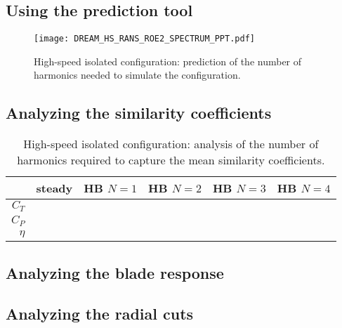 
\subsection{Using the prediction tool}
\label{sub:dream_hs_conv_hb_prediction_tool}

\begin{figure}[htp]
  \centering
  \texttt{[image: DREAM\_HS\_RANS\_ROE2\_SPECTRUM\_PPT.pdf]}
  \caption{High-speed isolated configuration: prediction of the number
  of harmonics needed to simulate the configuration.}
  \label{fig:DREAM_HS_RANS_ROE2_SPECTRUM_PPT}
\end{figure}

\subsection{Analyzing the similarity coefficients}
\label{sub:dream_hs_conv_hb_sim_coeff}
\begin{table}[htp]
   \centering
  \begin{tabular}{rccccc}
    \toprule
    & steady & HB $N=1$ & HB $N=2$ & HB $N=3$ & HB $N=4$ \\
    \midrule
    $C_T$  &  & & \\
    $C_P$  &  & & \\
    $\eta$ &  & & \\
    \bottomrule
  \end{tabular}
  \caption{High-speed isolated configuration: analysis of the number of harmonics
  required to capture the mean similarity coefficients.}
  \label{tab:dream_hs_hb_conv_sim}
\end{table}

\subsection{Analyzing the blade response}
\label{sub:dream_hs_conv_hb_blade_response}



\subsection{Analyzing the radial cuts}
\label{sub:dream_hs_conv_hb_slice_r}

